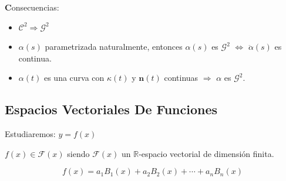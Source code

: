\documentclass[ebook,oneside]{memoir}
\begin{document}
{\textbf Consecuencias:}
\begin{itemize}
\item ${\mathcal  C}^2 \Rightarrow {\mathcal  G}^2$
\item $\alpha(s)$ parametrizada naturalmente, entonces $\alpha(s)$ es ${\mathcal  G}^2$ $\Leftrightarrow$  $\ddot{\alpha}(s)$ es continua.
\item $\alpha(t)$ es una curva con $\kappa(t)$ y $\mathbf{n}(t)$ continuas $\Rightarrow$ $\alpha$ es ${\mathcal  G}^2$.

\end{itemize}

\subsection{Espacios Vectoriales De Funciones}

Estudiaremos: $y=f(x)$

\vspace{0.5cm}

$f(x)\in {\mathcal  F}(x)$ siendo ${\mathcal  F}(x)$ un $\mathbb{R}$-espacio vectorial de dimensi\'{o}n finita.

$$f(x)=a_1 B_1(x)+a_2 B_2(x)+\cdots+a_n B_n(x)$$

%
%
%
%
%
%
%
%
\end{document}
